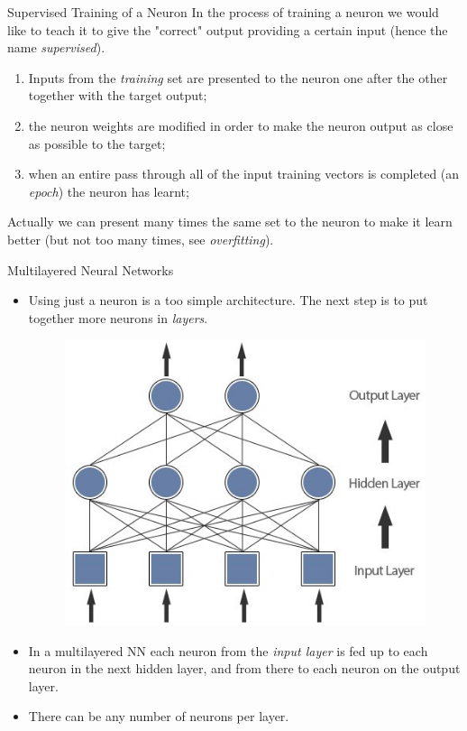 \documentclass{beamer}
\begin{document}
\begin{frame}{Supervised Training of a Neuron}
  In the process of training a neuron we would like to teach it to give the "correct" output providing a certain input (hence the name \emph{supervised}).
  \begin{enumerate}
    \item Inputs from the \emph{training} set are presented to the neuron one after the other together with the target output;
    \item the neuron weights are modified in order to make the neuron output as close as possible to the target;
    \item when an entire pass through all of the input training vectors is completed (an \emph{epoch}) the neuron has learnt;
  \end{enumerate}
  Actually we can present many times the same set to the neuron to make it learn better (but not too many times, see \emph{overfitting}).
\end{frame}

\begin{frame}{Multilayered Neural Networks}
  \begin{itemize}
    \item Using just a neuron is a too simple architecture. The next step is to put together more neurons in \emph{layers}.
      \begin{figure}[htb]
        \begin{center}
          \includegraphics[width=0.40\linewidth]{multilayer}
        \end{center}
      \end{figure}
    \item In a multilayered NN each neuron from the \emph{input layer} is fed up to each neuron in the next hidden layer, and from there to each neuron on the output layer. 
    \item There can be any number of neurons per layer.
  \end{itemize}
\end{frame}
\end{document}
